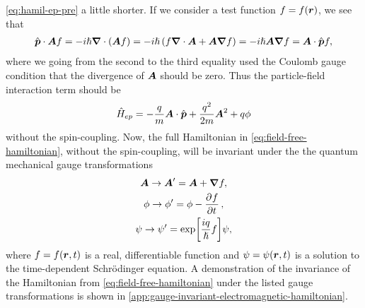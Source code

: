             \autoref{eq:hamil-ep-pre} a little shorter.
            If we consider a test function $f = f(\boldsymbol{r})$, we see that
            \begin{align}
                \hat{\boldsymbol{p}}\cdot\boldsymbol{A}f
                = -i\hslash\boldsymbol{\nabla}\cdot\left( 
                    \boldsymbol{A}f
                 \right)
                = -i\hslash\left( 
                    f\boldsymbol{\nabla}\cdot\boldsymbol{A}
                    + \boldsymbol{A}\boldsymbol{\nabla}f
                 \right)
                = -i\hslash\boldsymbol{A}\boldsymbol{\nabla}f
                = \boldsymbol{A}\cdot \hat{\boldsymbol{p}} f,
            \end{align}
            where we going from the second to the third equality used the
            Coulomb gauge condition that the divergence of $\boldsymbol{A}$ should be
            zero.
            Thus the particle-field interaction term should be
            \begin{align}
                \hat{H}_{ep}
                =
                -\frac{q}{m}\boldsymbol{A}\cdot\hat{\boldsymbol{p}}
                + \frac{q^2}{2m}
                \boldsymbol{A}^2
                + q\phi
                \label{eq:hamil-ep}
            \end{align}
            without the spin-coupling.
            Now, the full Hamiltonian in \autoref{eq:field-free-hamiltonian},
            without the spin-coupling, will be invariant under the the quantum
            mechanical gauge transformations
            \cite{joachain2012atoms}
            \begin{gather}
                \vfg{A} \to \vfg{A}' = \vfg{A} + \vfg{\nabla}f,
                \label{eq:gauge-invariant-vector-potential}
                \\
                \phi \to \phi' = \phi - \dpd{f}{t},
                \label{eq:gauge-invariant-scalar-potential}
                \\
                \psi \to \psi' = \exp[\frac{iq}{\hslash}f]\psi,
                \label{eq:gauge-invariant-wave-function}
            \end{gather}
            where $f = f(\boldsymbol{r}, t)$ is a real, differentiable function and
            $\psi = \psi(\boldsymbol{r}, t)$ is a solution to the time-dependent
            Schrödinger equation.
            A demonstration of the invariance of the Hamiltonian from
            \autoref{eq:field-free-hamiltonian} under the listed gauge
            transformations is shown in
            \autoref{app:gauge-invariant-electromagnetic-hamiltonian}.

